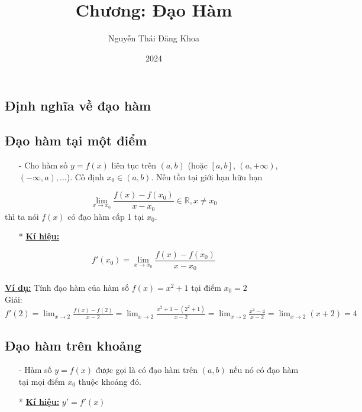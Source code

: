 \documentclass{article}
\title{\huge \textbf{Chương: Đạo Hàm}}
\author{Nguyễn Thái Đăng Khoa}
\date{2024}
\begin{document}
	\maketitle
	\begin{Large}
	\section{Định nghĩa về đạo hàm}
	\subsection{Đạo hàm tại một điểm}
		\begin{itemize}
			\item [-] Cho hàm số $y=f(x)$ liên tục trên $(a,b)$ (hoặc $[a,b]$, $(a,+\infty)$, $(-\infty,a),...$). Cố định $x_{0} \in (a,b)$. Nếu tồn tại giới hạn hữu hạn
		\end{itemize}
		\[\lim_{x\to x_{0}}\frac{f(x)-f(x_{0})}{x-x_{0}}\in \mathbb{R}, x \not = x_{0}\]
		thì ta nói $f(x)$ có đạo hàm cấp 1 tại $x_{0}$.
		\begin{itemize}
			\item [*]\textbf{\underline{Kí hiệu:}}
		\end{itemize}
		\[f'(x_{0})=\lim_{x\to x_{0}}\frac{f(x)-f(x_{0})}{x-x_{0}}\]\\
		\underline{\textbf{Ví dụ:}} Tính đạo hàm của hàm số $f(x)=x^2+1$ tại điểm $x_{0}=2$\\
		Giải:\\
		$f'(2)=\displaystyle\lim_{x\to 2}\frac{f(x)-f(2)}{x-2}=\displaystyle\lim_{x\to 2}\frac{x^2+1-(2^2+1)}{x-2}=\displaystyle\lim_{x\to 2}\frac{x^2-4}{x-2}=\displaystyle\lim_{x\to 2}(x+2)=4$
		\subsection{Đạo hàm trên khoảng}
		\begin{itemize}
			\item [-] Hàm số $y=f(x)$ được gọi là có đạo hàm trên $(a,b)$ nếu nó có đạo hàm tại mọi điểm $x_{0}$ thuộc khoảng đó.
		\end{itemize}
		\begin{itemize}
			\item [*]\textbf{\underline{Kí hiệu:}} $y'=f'(x)$
		\end{itemize}

\end{Large}
\end{document}
